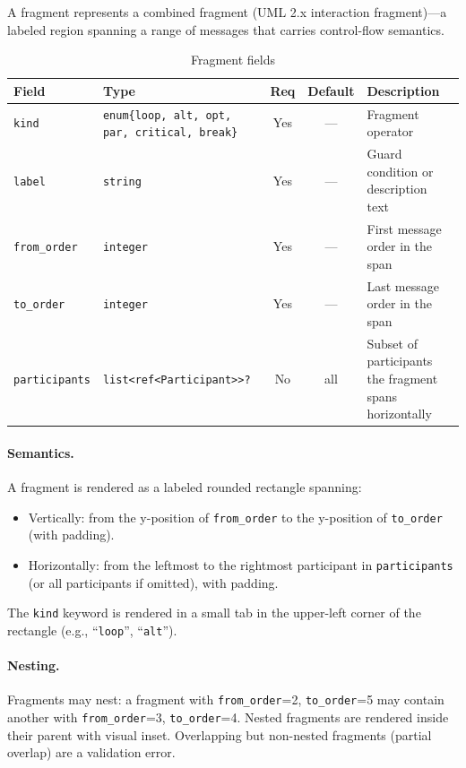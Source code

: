 A fragment represents a combined fragment (UML 2.x interaction fragment)---a labeled region spanning a range of messages that carries control-flow semantics.

\begin{table}[h]
\centering
\small
\begin{tabular}{llccp{4.0cm}}
\toprule
\textbf{Field} & \textbf{Type} & \textbf{Req} & \textbf{Default} & \textbf{Description} \\
\midrule
\texttt{kind} & \texttt{enum\{loop, alt, opt, par, critical, break\}} & Yes & --- & Fragment operator \\
\texttt{label} & \texttt{string} & Yes & --- & Guard condition or description text \\
\texttt{from\_order} & \texttt{integer} & Yes & --- & First message order in the span \\
\texttt{to\_order} & \texttt{integer} & Yes & --- & Last message order in the span \\
\texttt{participants} & \texttt{list<ref<Participant>>?} & No & all & Subset of participants the fragment spans horizontally \\
\bottomrule
\end{tabular}
\caption{Fragment fields}
\label{tab:seq-fragment-fields}
\end{table}

\paragraph{Semantics.}
A fragment is rendered as a labeled rounded rectangle spanning:
\begin{itemize}
  \item Vertically: from the y-position of \texttt{from\_order} to the y-position of \texttt{to\_order} (with padding).
  \item Horizontally: from the leftmost to the rightmost participant in \texttt{participants} (or all participants if omitted), with padding.
\end{itemize}

The \texttt{kind} keyword is rendered in a small tab in the upper-left corner of the rectangle (e.g., ``\texttt{loop}'', ``\texttt{alt}'').

\paragraph{Nesting.}
Fragments may nest: a fragment with \texttt{from\_order}=2, \texttt{to\_order}=5 may contain another with \texttt{from\_order}=3, \texttt{to\_order}=4. Nested fragments are rendered inside their parent with visual inset. Overlapping but non-nested fragments (partial overlap) are a validation error.


